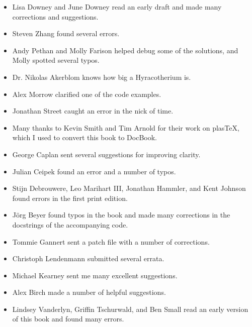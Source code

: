 \documentclass[12pt]{book}
\theoremstyle{exercise}
\begin{document}
\begin{itemize}

\item Lisa Downey and June Downey read an early draft and made many
corrections and suggestions.

\item Steven Zhang found several errors.

\item Andy Pethan and Molly Farison helped debug some of the solutions,
and Molly spotted several typos.

\item Dr. Nikolas Akerblom knows how big a Hyracotherium is.

\item Alex Morrow clarified one of the code examples.

\item Jonathan Street caught an error in the nick of time.

\item Many thanks to Kevin Smith and Tim Arnold for their work on
plasTeX, which I used to convert this book to DocBook.

\item George Caplan sent several suggestions for improving clarity.

\item Julian Ceipek found an error and a number of typos.

\item Stijn Debrouwere, Leo Marihart III, Jonathan Hammler, and Kent Johnson
found errors in the first print edition.

\item J\"{o}rg Beyer found typos in the book and made many corrections
in the docstrings of the accompanying code.

\item Tommie Gannert sent a patch file with a number of corrections.

\item Christoph Lendenmann submitted several errata.

\item Michael Kearney sent me many excellent suggestions.

\item Alex Birch made a number of helpful suggestions.

\item Lindsey Vanderlyn, Griffin Tschurwald, and Ben Small read an
  early version of this book and found many errors.


\end{itemize}
\end{document}

